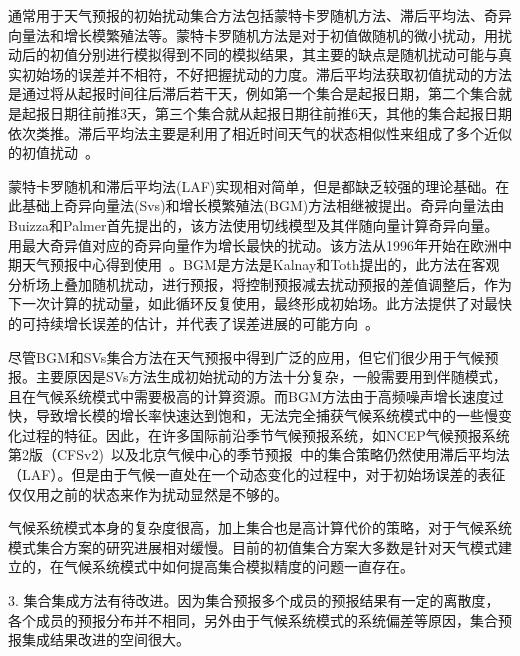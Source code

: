 通常用于天气预报的初始扰动集合方法包括蒙特卡罗随机方法、滞后平均法、奇异向量法和增长模繁殖法等。蒙特卡罗随机方法是对于初值做随机的微小扰动，用扰动后的初值分别进行模拟得到不同的模拟结果，其主要的缺点是随机扰动可能与真实初始场的误差并不相符，不好把握扰动的力度。滞后平均法获取初值扰动的方法是通过将从起报时间往后滞后若干天，例如第一个集合是起报日期，第二个集合就是起报日期往前推3天，第三个集合就从起报日期往前推6天，其他的集合起报日期依次类推。滞后平均法主要是利用了相近时间天气的状态相似性来组成了多个近似的初值扰动~\cite{hoffman1983lagged}。

蒙特卡罗随机和滞后平均法(LAF)实现相对简单，但是都缺乏较强的理论基础。在此基础上奇异向量法(Svs)和增长模繁殖法(BGM)方法相继被提出。奇异向量法由Buizza和Palmer首先提出的，该方法使用切线模型及其伴随向量计算奇异向量。用最大奇异值对应的奇异向量作为增长最快的扰动。该方法从1996年开始在欧洲中期天气预报中心得到使用~\cite{molteni1996ecmwf}。BGM是方法是Kalnay和Toth提出的，此方法在客观分析场上叠加随机扰动，进行预报，将控制预报减去扰动预报的差值调整后，作为下一次计算的扰动量，如此循环反复使用，最终形成初始场。此方法提供了对最快的可持续增长误差的估计，并代表了误差进展的可能方向~\cite{toth1997ensemble}。

尽管BGM和SVs集合方法在天气预报中得到广泛的应用，但它们很少用于气候预报。主要原因是SVs方法生成初始扰动的方法十分复杂，一般需要用到伴随模式，且在气候系统模式中需要极高的计算资源。而BGM方法由于高频噪声增长速度过快，导致增长模的增长率快速达到饱和，无法完全捕获气候系统模式中的一些慢变化过程的特征。因此，在许多国际前沿季节气候预报系统，如NCEP气候预报系统第2版（CFSv2)~\cite{saha2014ncep}以及北京气候中心的季节预报~\cite{liu2014relationships}中的集合策略仍然使用滞后平均法（LAF）。但是由于气候一直处在一个动态变化的过程中，对于初始场误差的表征仅仅用之前的状态来作为扰动显然是不够的。

%
气候系统模式本身的复杂度很高，加上集合也是高计算代价的策略，对于气候系统模式集合方案的研究进展相对缓慢。目前的初值集合方案大多数是针对天气模式建立的，在气候系统模式中如何提高集合模拟精度的问题一直存在。


3. 集合集成方法有待改进。因为集合预报多个成员的预报结果有一定的离散度，各个成员的预报分布并不相同，另外由于气候系统模式的系统偏差等原因，集合预报集成结果改进的空间很大。

